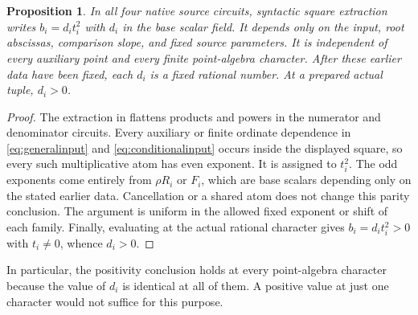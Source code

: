 \documentclass[11pt,a4paper]{article}
\newtheorem{proposition}[theorem]{Proposition}
\theoremstyle{remark}\newtheorem{remark}[theorem]{Remark}
\begin{document}
\begin{proposition}\label{prop:scalar}
In all four native source circuits, syntactic square extraction writes
$b_i=d_i t_i^2$ with $d_i$ in the base scalar field. It depends only
on the input, root abscissas, comparison slope, and fixed source
parameters. It is independent of every auxiliary point and every
finite point-algebra character. After these earlier data have been
fixed, each $d_i$ is a fixed rational number. At a prepared actual
tuple, $d_i>0$.
\end{proposition}
\begin{proof}
The extraction in \cite{UnitNorm} flattens products and powers in
the numerator and denominator circuits. Every auxiliary or finite
ordinate dependence in \eqref{eq:generalinput} and
\eqref{eq:conditionalinput} occurs inside the displayed square, so
every such multiplicative atom has even exponent. It is assigned to
$t_i^2$. The odd exponents come entirely from $\rho R_i$ or $F_i$,
which are base scalars depending only on the stated earlier data.
Cancellation or a shared atom does not change this parity conclusion.
The argument is uniform in the allowed fixed exponent or shift of
each family. Finally, evaluating at the actual rational character
gives $b_i=d_it_i^2>0$ with $t_i\ne0$, whence $d_i>0$.
\end{proof}

In particular, the positivity conclusion holds at every point-algebra
character because the value of $d_i$ is identical at all of them. A
positive value at just one character would not suffice for this purpose.
\end{document}
